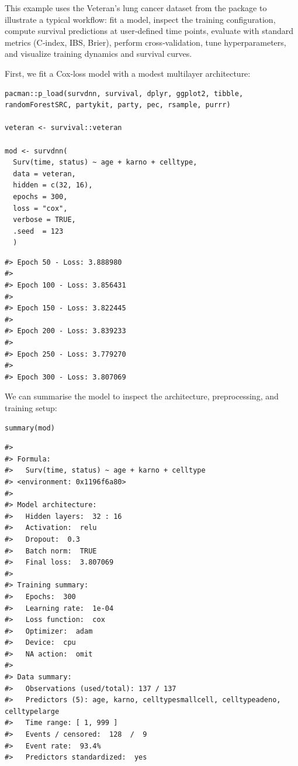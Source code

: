 This example uses the Veteran's lung cancer dataset from the  package \citep{survival-book} to illustrate a typical  workflow: fit a model, inspect the training configuration, compute survival predictions at user‑defined time points, evaluate with standard metrics (C‑index, IBS, Brier), perform cross‑validation, tune hyperparameters, and visualize training dynamics and survival curves.

First, we fit a Cox‑loss model with a modest multilayer architecture:

\begin{verbatim}
pacman::p_load(survdnn, survival, dplyr, ggplot2, tibble, randomForestSRC, partykit, party, pec, rsample, purrr)

veteran <- survival::veteran

mod <- survdnn(
  Surv(time, status) ~ age + karno + celltype,
  data = veteran,
  hidden = c(32, 16),
  epochs = 300,
  loss = "cox",
  verbose = TRUE,
  .seed  = 123
  )
\end{verbatim}

\begin{verbatim}
#> Epoch 50 - Loss: 3.888980
#> 
#> Epoch 100 - Loss: 3.856431
#> 
#> Epoch 150 - Loss: 3.822445
#> 
#> Epoch 200 - Loss: 3.839233
#> 
#> Epoch 250 - Loss: 3.779270
#> 
#> Epoch 300 - Loss: 3.807069
\end{verbatim}

We can summarise the model to inspect the architecture, preprocessing, and training setup:

\begin{verbatim}
summary(mod)
\end{verbatim}

\begin{verbatim}
#> 
#> Formula:
#>   Surv(time, status) ~ age + karno + celltype
#> <environment: 0x1196f6a80>
#> 
#> Model architecture:
#>   Hidden layers:  32 : 16 
#>   Activation:  relu 
#>   Dropout:  0.3 
#>   Batch norm:  TRUE 
#>   Final loss:  3.807069 
#> 
#> Training summary:
#>   Epochs:  300 
#>   Learning rate:  1e-04 
#>   Loss function:  cox 
#>   Optimizer:  adam 
#>   Device:  cpu 
#>   NA action:  omit 
#> 
#> Data summary:
#>   Observations (used/total): 137 / 137
#>   Predictors (5): age, karno, celltypesmallcell, celltypeadeno, celltypelarge
#>   Time range: [ 1, 999 ]
#>   Events / censored:  128  /  9 
#>   Event rate:  93.4% 
#>   Predictors standardized:  yes
\end{verbatim}

